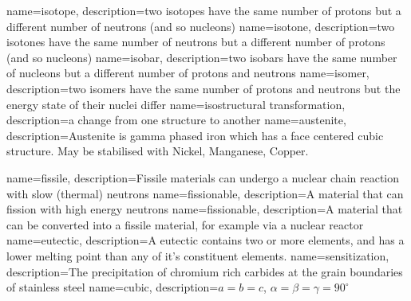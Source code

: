 {
    name=isotope,
    description={two isotopes have the same number of protons but a different number of neutrons (and so nucleons)}
}
{
    name=isotone,
    description={two isotones have the same number of neutrons but a different number of protons (and so nucleons)}
}
{
    name=isobar,
    description={two isobars have the same number of nucleons but a different number of protons and neutrons}
}
{
    name=isomer,
    description={two isomers have the same number of protons and neutrons but the energy state of their nuclei differ}
}
{
    name=isostructural transformation,
    description={a change from one structure to another}
} 
{
    name=austenite,
    description={Austenite is gamma phased iron which has a face centered cubic structure.  May be stabilised with Nickel, Manganese, Copper.}
}
 
{
    name=fissile,
    description={Fissile materials can undergo a nuclear chain reaction with slow (thermal) neutrons}
}
{
   name=fissionable,
   description={A material that can fission with high energy neutrons}
}
{
   name=fissionable,
   description={A material that can be converted into a fissile material, for example via a nuclear reactor}
}
{
    name=eutectic,
    description={A eutectic contains two or more elements, and has a lower melting point than any of it's constituent elements.}
}
{
     name=sensitization,
     description={The precipitation of chromium rich carbides at the grain boundaries of stainless steel}
}
{
    name=cubic,
    description={$a = b = c$, $ \alpha = \beta = \gamma = 90^{\circ}$}
}

